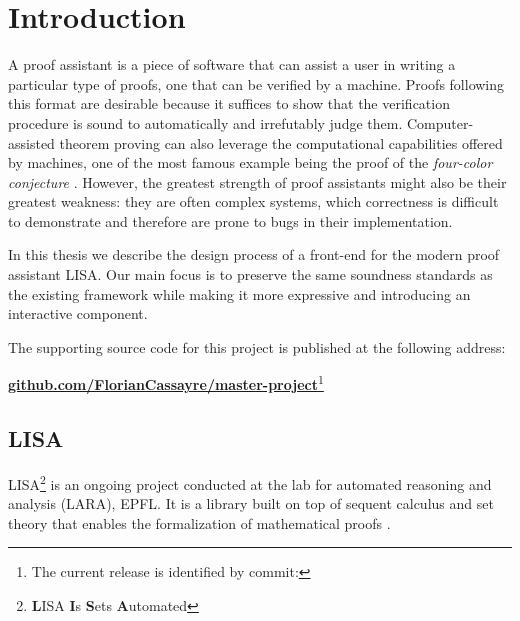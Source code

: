 \section{Introduction}
\label{sec:introduction}

A proof assistant is a piece of software that can assist a user in writing a particular type of proofs, one that can be verified by a machine. Proofs following this format are desirable because it suffices to show that the verification procedure is sound to automatically and irrefutably judge them. Computer-assisted theorem proving can also leverage the computational capabilities offered by machines, one of the most famous example being the proof of the \textit{four-color conjecture} \cite{Appel1989}. However, the greatest strength of proof assistants might also be their greatest weakness: they are often complex systems, which correctness is difficult to demonstrate and therefore are prone to bugs in their implementation.

In this thesis we describe the design process of a front-end for the modern proof assistant LISA. Our main focus is to preserve the same soundness standards as the existing framework while making it more expressive and introducing an interactive component.

The supporting source code for this project is published at the following address:
\begin{center}
\href{http://github.com/FlorianCassayre/master-project}{\textbf{github.com/FlorianCassayre/master-project}}\footnote{The current release is identified by commit: }
\end{center}

\subsection{LISA}

LISA\footnote{\textbf{L}ISA \textbf{I}s \textbf{S}ets \textbf{A}utomated} is an ongoing project conducted at the lab for automated reasoning and analysis (LARA), EPFL. It is a library built on top of sequent calculus and set theory that enables the formalization of mathematical proofs \cite{Guilloud2022-2}.

